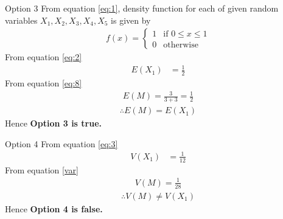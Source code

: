 \documentclass{beamer}
\begin{document}
\begin{frame}{Option 3}
    From equation \eqref{eq:1}, density function for each of given random variables $X_1,X_2,X_3,X_4,X_5$ is given by
\begin{align}
    f(x)=
    \begin{cases}
    1 & \text{if } 0\leq x \leq 1\\
    0 & \text{otherwise}
    \end{cases}
\end{align}
From equation \eqref{eq:2} 
\begin{align}
    E(X_1)&=\frac{1}{2}
\end{align}
From equation \eqref{eq:8}
\begin{align}
    E(M)=\frac{3}{3+3}=\frac{1}{2}
\end{align}
 \begin{align}
      \therefore E(M)=E(X_1)
 \end{align}
   Hence \textbf{Option 3 is true.}
\end{frame}
\begin{frame}{Option 4}
From equation \eqref{eq:3}
\begin{align}
      V(X_1)&=\frac{1}{12}
\end{align}
From equation \eqref{var}
\begin{align}
    V(M)=\frac{1}{28}
\end{align}
\begin{align}
      \therefore V(M)\neq V(X_1)
 \end{align}
   Hence \textbf{Option 4 is false.}
    
\end{frame}
\end{document}
